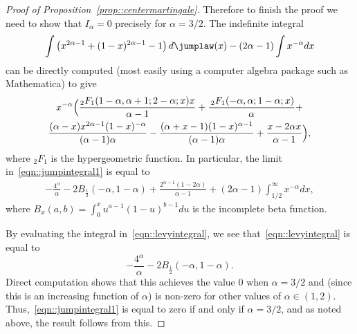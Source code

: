 \documentclass[10pt]{amsart}
\theoremstyle{plain}
\numberwithin{theorem}{section}
\theoremstyle{definition}
\begin{document}
\begin{proof}[Proof of Proposition~\ref{prop::centermartingale}]
Therefore to finish the proof we need to show that $I_\alpha = 0$ precisely for $\alpha=3/2$. The indefinite integral
\begin{equation}
\label{eqn::jumpintegral2}
\int \left( x^{2\alpha - 1} + (1-x)^{2\alpha -1} - 1 \right) d\jumplaw(x) - (2\alpha - 1) \int x^{-\alpha} dx
\end{equation}
can be directly computed (most easily using a computer algebra package such as Mathematica) to give
\begin{multline*}
x^{-\alpha} \Bigl(\frac{_2F_1(1-\alpha,\alpha+1;2-\alpha;x) x }{\alpha-1}+\frac{\,
_2F_1(-\alpha,\alpha;1-\alpha;x)}{\alpha}+\\
\frac{(\alpha-x) x^{2 \alpha-1} (1-x)^{-\alpha}}{(\alpha-1) \alpha}-\frac{(\alpha+x-1)
(1-x)^{\alpha-1}}{(\alpha-1) \alpha}+ \frac{x-2 \alpha x}{\alpha-1} \Bigr),
\end{multline*}
where $_2F_1$ is the hypergeometric function. In particular, the limit in~\eqref{eqn::jumpintegral1} is equal to
\begin{align}
\label{eqn::levyintegral}
-\frac{4^\alpha}{\alpha} - 2 B_{\frac{1}{2}}(-\alpha,1-\alpha) + \frac{2^{\alpha-1} (1-2 \alpha)}{\alpha-1} + (2\alpha - 1) \int_{1/2}^\infty x^{-\alpha } dx,
\end{align}
where $B_{x}(a,b) = \int_0^x u^{a-1}(1-u)^{b-1} du$ is the incomplete beta function.

By evaluating the integral in~\eqref{eqn::levyintegral}, we see that~\eqref{eqn::levyintegral} is equal to
\[
-\frac{4^\alpha}{\alpha} - 2 B_{\frac{1}{2}}(-\alpha,1-\alpha).
\]
Direct computation shows that this achieves the value $0$ when $\alpha = 3/2$ and (since this is an increasing function of $\alpha$) is non-zero for other values of $\alpha \in (1,2)$. Thus,~\eqref{eqn::jumpintegral1} is equal to zero if and only if $\alpha = 3/2$, and as noted above, the result follows from this.
\end{proof}
\end{document}
